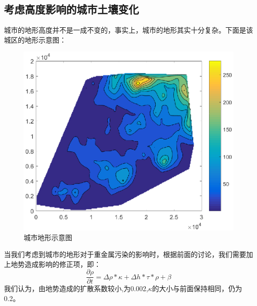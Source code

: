 \documentclass[a4paper]{article}
\begin{document}
\subsection{考虑高度影响的城市土壤变化}
城市的地形高度并不是一成不变的，事实上，城市的地形其实十分复杂。下面是该城区的地形示意图：
\begin{figure}[H]
    \centerline{
    \includegraphics[scale=0.8]{pictures/height.eps}}
    \caption{城市地形示意图}
    \label{fig:height}
\end{figure}
当我们考虑到城市的地形对于重金属污染的影响时，根据前面的讨论，我们需要加上地势造成影响的修正项，即：
\begin{equation}
 \frac{\partial \rho}{\partial t}= \Delta \rho * \kappa + \Delta h * \tau * \rho + \beta
\end{equation}
我们认为，由地势造成的扩散系数较小,为0.002,$\kappa$的大小与前面保持相同，仍为0.2。
\end{document}
